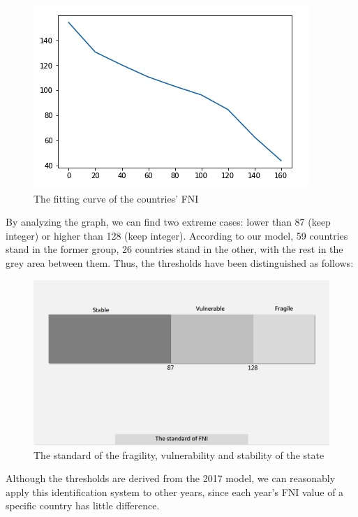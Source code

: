 \documentclass[a4paper,12pt]{article}
\begin{document}
\begin{figure} [H]
\centering
\includegraphics[width=\textwidth]{3.jpg}
\caption{The fitting curve of the countries' FNI}
\label{fig1}
\end{figure}


By analyzing the graph, we can find two extreme cases: lower than 87 (keep integer) or higher than 128 (keep integer). According to our model, 59 countries stand in the former group, 26 countries stand in the other, with the rest in the grey area between them. Thus, the thresholds have been distinguished as follows:

\begin{figure} [H]
\centering
\includegraphics[width=15cm]{2.jpg}
\caption{The standard of the fragility, vulnerability and stability of the state}
\label{fig2}
\end{figure}

Although the thresholds are derived from the 2017 model, we can reasonably apply this identification system to other years, since each year's FNI value of a specific country has little difference.
\end{document}
